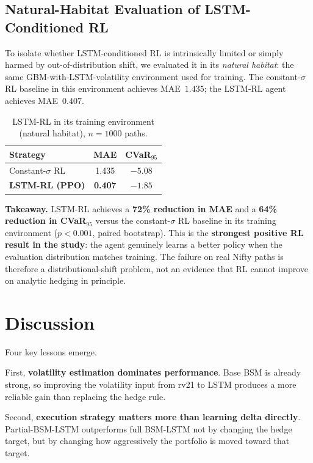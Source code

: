 \documentclass[10pt,a4paper]{article}
\begin{document}
\subsection*{Natural-Habitat Evaluation of LSTM-Conditioned RL}
To isolate whether LSTM-conditioned RL is intrinsically limited or simply
harmed by out-of-distribution shift, we evaluated it in its
\emph{natural habitat}: the same GBM-with-LSTM-volatility environment used
for training.  The constant-$\sigma$ RL baseline in this environment
achieves MAE~$1.435$; the LSTM-RL agent achieves MAE~$\mathbf{0.407}$.

\begin{table}[H]
\centering
\caption{LSTM-RL in its training environment (natural habitat), $n=1000$ paths.}
\label{tab:habitat}
\begin{tabular}{lcc}
\toprule
Strategy & MAE & CVaR$_{95}$ \\
\midrule
Constant-$\sigma$ RL & 1.435 & $-5.08$ \\
\textbf{LSTM-RL (PPO)} & \textbf{0.407} & $\mathbf{-1.85}$ \\
\bottomrule
\end{tabular}
\end{table}

\textbf{Takeaway.}  LSTM-RL achieves a \textbf{72\% reduction in MAE} and a
\textbf{64\% reduction in CVaR$_{95}$} versus the constant-$\sigma$ RL
baseline in its training environment ($p<0.001$, paired bootstrap).  This is the
\textbf{strongest positive RL result in the study}: the agent genuinely
learns a better policy when the evaluation distribution matches training.
The failure on real Nifty paths is therefore a distributional-shift problem,
not an evidence that RL cannot improve on analytic hedging in principle.

\section{Discussion}
Four key lessons emerge.

First, \textbf{volatility estimation dominates performance}. Base BSM is
already strong, so improving the volatility input from rv21 to LSTM produces a
more reliable gain than replacing the hedge rule.

Second, \textbf{execution strategy matters more than learning delta directly}.
Partial-BSM-LSTM outperforms full BSM-LSTM not by changing the hedge target,
but by changing how aggressively the portfolio is moved toward that target.
\end{document}
